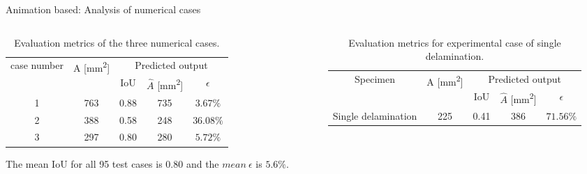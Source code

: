 \documentclass[10pt,aspectratio=169,dvipsnames]{beamer} %
\begin{document}
	\begin{frame}{Animation based: Analysis of numerical cases}		
		\begin{columns}[T]
			\tiny
			\begin{column}[t]{.5\textwidth}
				\begin{table}[!h]
					\centering
					\caption{Evaluation metrics of the three numerical cases.}
					\begin{tabular}{ccccc}
						\toprule[1.5pt]
						\multirow{2}{*}{case number} & \multicolumn{1}{c}{\multirow{2}{*}{A [mm\textsuperscript{2}]}} & \multicolumn{3}{c}{Predicted output} \\ 
						\cmidrule(lr){3-5} & & \multicolumn{1}{c}{IoU} & \multicolumn{1}{c}{\(\hat{A}\) [mm\textsuperscript{2}]} & \(\epsilon\) \\
						\midrule
						1 & 763 & \multicolumn{1}{c}{0.88} & \multicolumn{1}{c}{735} & \(3.67\%\) \\ 
						2 & 388 & \multicolumn{1}{c}{0.58} & \multicolumn{1}{c}{248} & \(36.08\%\) \\ 
						3 & 297 & \multicolumn{1}{c}{0.80} & \multicolumn{1}{c}{280} & \(5.72\%\) \\			 					
						\bottomrule[1.5pt]
					\end{tabular}	
					\label{tab:num_cases_}
				\end{table}
				\vfil
				\normalsize{The mean IoU for all 95 test cases is \(0.80\) and the \(mean\ \epsilon\) is \(5.6\%\).}
			\end{column}
			\begin{column}[t]{.5\textwidth}
				\begin{table}[!h]
					\centering
					\caption{Evaluation metrics for experimental case of single delamination.}
					\begin{tabular}{ccccc}
						\toprule[1.5pt]
						\multirow{2}{*}{Specimen} & \multicolumn{1}{c}{\multirow{2}{*}{A [mm\textsuperscript{2}]}} & \multicolumn{3}{c}{Predicted output} \\ 
						\cmidrule(lr){3-5} & & \multicolumn{1}{c}{IoU} & \multicolumn{1}{c}{\(\hat{A}\) [mm\textsuperscript{2}]} & \(\epsilon\) \\
						\midrule
						Single delamination & 225 & \multicolumn{1}{c}{0.41} &  \multicolumn{1}{c}{386} & \(71.56\%\) \\ 
						\bottomrule[1.5pt]										
					\end{tabular}
				\end{table}
				\begin{table}[!h]

\end{table}
\end{column}
\end{columns}
\end{frame}
\end{document}
